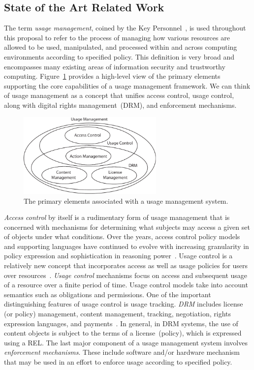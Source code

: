 \documentclass{sbir}
\begin{document}
\subsection{State of the Art Related Work}
The term \emph{usage management}, coined by the Key Personnel~\cite{JaHeLa:10}, is used throughout this proposal to refer to the process of managing how various resources are allowed to be used, manipulated, and processed within and across computing environments according to specified policy. This definition is very broad and encompasses many existing areas of information security and trustworthy computing. Figure~\ref{UM} provides a high-level view of the primary elements supporting the core capabilities of a usage management framework. We can think of usage management as a concept that unifies access control, usage control, along with digital rights management~(DRM), and enforcement mechanisms.
\begin{figure}
  \centerline{\includegraphics[width=2.8in]{./images/usage_management.pdf}}
  \caption{The primary elements associated with a usage management system.}\label{UM}
\end{figure}
\emph{Access control} by itself is a rudimentary form of usage management that is concerned with mechanisms for determining what subjects may access a given set of objects under what conditions. Over the years, access control policy models and supporting languages have continued to evolve with increasing granularity in policy expression and sophistication in reasoning power~\cite{BlPa:76,HuFeKu:06}. Usage control is a relatively new concept that incorporates access as well as usage policies for users over resources~\cite{PaSa:04}. \emph{Usage control} mechanisms focus on access and subsequent usage of a resource over a finite period of time. Usage control models take into account semantics such as obligations and permissions. One of the important distinguishing features of usage control is usage tracking. \emph{DRM} includes license (or policy) management, content management, tracking, negotiation, rights expression languages, and payments~\cite{HeJaKhHr:07,JaHe:08b,JaHeMa:06}. In general, in DRM systems, the use of content objects is subject to the terms of a license~(policy), which is expressed using a REL. The last major component of a usage management system involves \emph{enforcement mechanisms}. These include software and/or hardware mechanism that may be used in an effort to enforce usage according to specified policy.
\end{document}

